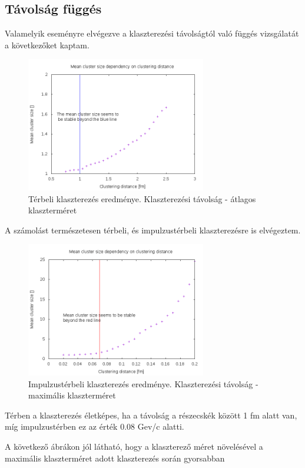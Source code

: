 \documentclass[a4paper,12pt]{article}
\begin{document}
\subsection{ Távolság függés}
\par Valamelyik eseményre elvégezve a klaszterezési távolságtól való függés vizsgálatát a következőket kaptam.
\begin{figure}[H]
	\centering
	\includegraphics[width=0.7\textwidth]{dist-mean.png}
	\caption{ Térbeli klaszterezés eredménye. Klaszterezési távolság - átlagos klaszterméret }
\end{figure}
\par A számolást természetesen térbeli, és impulzustérbeli klaszterezésre is elvégeztem.
\begin{figure}[H]
	\centering
	\includegraphics[width=0.7\textwidth]{momdist-mean.png}
	\caption{ Impulzustérbeli klaszterezés eredménye. Klaszterezési távolság - maximális klaszterméret }
\end{figure}
\par Térben a klaszterezés életképes, ha a távolság a részecskék között 1 fm alatt van, míg impulzustérben ez az érték 0.08 Gev/c alatti.
\par A következő ábrákon jól látható, hogy a klaszterező méret növelésével a maximális klaszterméret adott klaszterezés során gyorsabban
\end{document}
